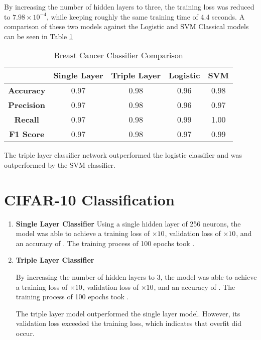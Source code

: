 \documentclass{article}
\begin{document}
    By increasing the number of hidden layers to three, the training loss was reduced to $7.98 \times 10^{-4}$, while keeping roughly the same training time of 4.4 seconds. A comparison of these two models against the Logistic and SVM Classical models can be seen in Table \ref{tab:P2}

    \begin{table}[htbp] 
        \centering
        \begin{tabular}{|c|c|c|c|c|}
            \hline
            & \textbf{Single Layer} & \textbf{Triple Layer} & \textbf{Logistic} & \textbf{SVM} \\
            \hline
            \textbf{Accuracy} & 0.97 & 0.98 & 0.96 & 0.98 \\
            \hline
            \textbf{Precision} & 0.97 & 0.98 & 0.96 & 0.97 \\
            \hline
            \textbf{Recall} & 0.97 & 0.98 & 0.99 & 1.00 \\
            \hline
            \textbf{F1 Score} & 0.97 & 0.98 & 0.97 & 0.99 \\
            \hline
        \end{tabular}
        \caption{Breast Cancer Classifier Comparison}
        \label{tab:P2}
    \end{table}
    The triple layer classifier network outperformed the logistic classifier and was outperformed by the SVM classifier.

\section{CIFAR-10 Classification}
\begin{enumerate}[label=\alph*. ]
    \item{\textbf{Single Layer Classifier}}
    Using a single hidden layer of 256 neurons, the model was able to achieve a training loss of $ \times 10^{}$, validation loss of $ \times 10^{}$, and an accuracy of . The training process of 100 epochs took .

    \item{\textbf{Triple Layer Classifier}}
    
    By increasing the number of hidden layers to 3, the model was able to achieve a training loss of $ \times 10^{}$, validation loss of $ \times 10^{}$, and an accuracy of . The training process of 100 epochs took .
    
    The triple layer model outperformed the single layer model. However, its validation loss exceeded the training loss, which indicates that overfit did occur.
\end{enumerate}
\end{document}

